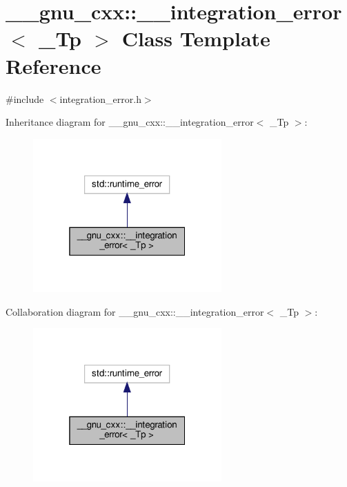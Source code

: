 \hypertarget{class____gnu__cxx_1_1____integration__error}{}\section{\+\_\+\+\_\+gnu\+\_\+cxx\+:\+:\+\_\+\+\_\+integration\+\_\+error$<$ \+\_\+\+Tp $>$ Class Template Reference}
\label{class____gnu__cxx_1_1____integration__error}


{\ttfamily \#include $<$integration\+\_\+error.\+h$>$}



Inheritance diagram for \+\_\+\+\_\+gnu\+\_\+cxx\+:\+:\+\_\+\+\_\+integration\+\_\+error$<$ \+\_\+\+Tp $>$\+:
\nopagebreak
\begin{figure}[H]
\begin{center}
\leavevmode
\includegraphics[width=205pt]{class____gnu__cxx_1_1____integration__error__inherit__graph}
\end{center}
\end{figure}


Collaboration diagram for \+\_\+\+\_\+gnu\+\_\+cxx\+:\+:\+\_\+\+\_\+integration\+\_\+error$<$ \+\_\+\+Tp $>$\+:
\nopagebreak
\begin{figure}[H]
\begin{center}
\leavevmode
\includegraphics[width=205pt]{class____gnu__cxx_1_1____integration__error__coll__graph}
\end{center}
\end{figure}
